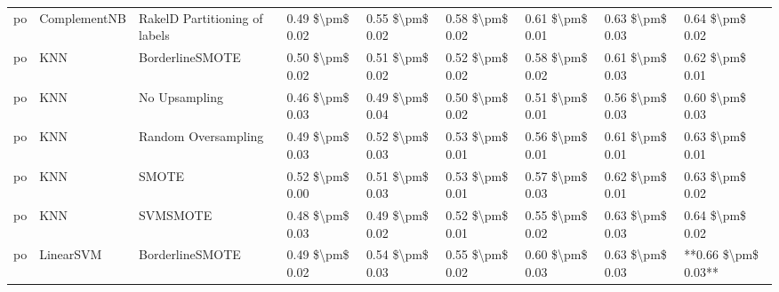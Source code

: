 \begin{tabular}{lllllllll}
      po &                    ComplementNB & RakelD Partitioning of labels & 0.49 \$\textbackslash pm\$ 0.02 &           0.55 \$\textbackslash pm\$ 0.02 &       0.58 \$\textbackslash pm\$ 0.02 &        0.61 \$\textbackslash pm\$ 0.01 &                         0.63 \$\textbackslash pm\$ 0.03 &     0.64 \$\textbackslash pm\$ 0.02 \\
      po &                             KNN &               BorderlineSMOTE & 0.50 \$\textbackslash pm\$ 0.02 &           0.51 \$\textbackslash pm\$ 0.02 &       0.52 \$\textbackslash pm\$ 0.02 &        0.58 \$\textbackslash pm\$ 0.02 &                         0.61 \$\textbackslash pm\$ 0.03 &     0.62 \$\textbackslash pm\$ 0.01 \\
      po &                             KNN &                 No Upsampling & 0.46 \$\textbackslash pm\$ 0.03 &           0.49 \$\textbackslash pm\$ 0.04 &       0.50 \$\textbackslash pm\$ 0.02 &        0.51 \$\textbackslash pm\$ 0.01 &                         0.56 \$\textbackslash pm\$ 0.03 &     0.60 \$\textbackslash pm\$ 0.03 \\
      po &                             KNN &           Random Oversampling & 0.49 \$\textbackslash pm\$ 0.03 &           0.52 \$\textbackslash pm\$ 0.03 &       0.53 \$\textbackslash pm\$ 0.01 &        0.56 \$\textbackslash pm\$ 0.01 &                         0.61 \$\textbackslash pm\$ 0.01 &     0.63 \$\textbackslash pm\$ 0.01 \\
      po &                             KNN &                         SMOTE & 0.52 \$\textbackslash pm\$ 0.00 &           0.51 \$\textbackslash pm\$ 0.03 &       0.53 \$\textbackslash pm\$ 0.01 &        0.57 \$\textbackslash pm\$ 0.03 &                         0.62 \$\textbackslash pm\$ 0.01 &     0.63 \$\textbackslash pm\$ 0.02 \\
      po &                             KNN &                      SVMSMOTE & 0.48 \$\textbackslash pm\$ 0.03 &           0.49 \$\textbackslash pm\$ 0.02 &       0.52 \$\textbackslash pm\$ 0.01 &        0.55 \$\textbackslash pm\$ 0.02 &                         0.63 \$\textbackslash pm\$ 0.03 &     0.64 \$\textbackslash pm\$ 0.02 \\
      po &                       LinearSVM &               BorderlineSMOTE & 0.49 \$\textbackslash pm\$ 0.02 &           0.54 \$\textbackslash pm\$ 0.03 &       0.55 \$\textbackslash pm\$ 0.02 &        0.60 \$\textbackslash pm\$ 0.03 &                         0.63 \$\textbackslash pm\$ 0.03 & **0.66 \$\textbackslash pm\$ 0.03** \\

\end{tabular}
